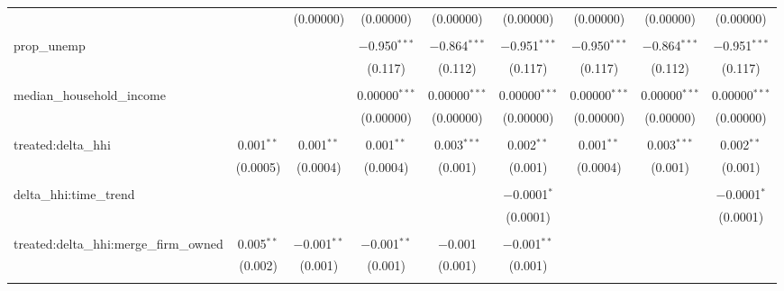 \begin{table}[H]
{\begin{tabular}{@{\extracolsep{5pt}}lcccccccc}
   &  & (0.00000) & (0.00000) & (0.00000) & (0.00000) & (0.00000) & (0.00000) & (0.00000) \\  

   & & & & & & & & \\  

  prop\_unemp &  &  & $-$0.950$^{***}$ & $-$0.864$^{***}$ & $-$0.951$^{***}$ & $-$0.950$^{***}$ & $-$0.864$^{***}$ & $-$0.951$^{***}$ \\  

   &  &  & (0.117) & (0.112) & (0.117) & (0.117) & (0.112) & (0.117) \\  

   & & & & & & & & \\  

  median\_household\_income &  &  & 0.00000$^{***}$ & 0.00000$^{***}$ & 0.00000$^{***}$ & 0.00000$^{***}$ & 0.00000$^{***}$ & 0.00000$^{***}$ \\  

   &  &  & (0.00000) & (0.00000) & (0.00000) & (0.00000) & (0.00000) & (0.00000) \\  

   & & & & & & & & \\  

  treated:delta\_hhi & 0.001$^{**}$ & 0.001$^{**}$ & 0.001$^{**}$ & 0.003$^{***}$ & 0.002$^{**}$ & 0.001$^{**}$ & 0.003$^{***}$ & 0.002$^{**}$ \\  

   & (0.0005) & (0.0004) & (0.0004) & (0.001) & (0.001) & (0.0004) & (0.001) & (0.001) \\  

   & & & & & & & & \\  

  delta\_hhi:time\_trend &  &  &  &  & $-$0.0001$^{*}$ &  &  & $-$0.0001$^{*}$ \\  

   &  &  &  &  & (0.0001) &  &  & (0.0001) \\  

   & & & & & & & & \\  

  treated:delta\_hhi:merge\_firm\_owned & 0.005$^{**}$ & $-$0.001$^{**}$ & $-$0.001$^{**}$ & $-$0.001 & $-$0.001$^{**}$ &  &  &  \\  

   & (0.002) & (0.001) & (0.001) & (0.001) & (0.001) &  &  &  \\  

   & & & & & & & & \\  


\end{tabular}}
\end{table}
